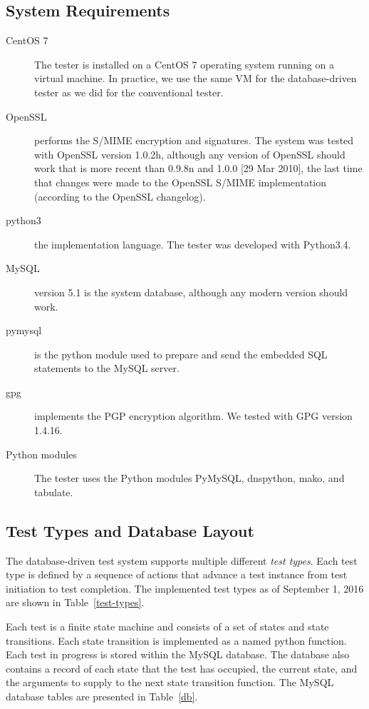 \documentclass[preprint,3p,11pt]{elsarticle}
\begin{document}
\subsection{System Requirements}

\begin{description}
\item[CentOS 7] The tester is installed on a CentOS 7 operating
  system running on a virtual machine. In practice, we use the same VM
  for the database-driven tester as we did for the conventional tester.
\item[OpenSSL] performs the S/MIME encryption and
signatures. The system was tested with OpenSSL version 1.0.2h, although any
version of OpenSSL should work that is more recent than 0.9.8n and
1.0.0 [29 Mar 2010], the last time that changes were made to the OpenSSL
S/MIME implementation (according to the OpenSSL changelog). 

\item[python3] the implementation language. The tester was developed
  with Python3.4.

\item[MySQL] version 5.1 is the system database,
although any modern version should work. 

\item[pymysql] is the python module used to prepare and send the embedded SQL
statements to the MySQL server.

\item[gpg] implements the PGP encryption
algorithm. We tested with GPG version 1.4.16.

\item[Python modules] The tester uses the Python modules PyMySQL,
dnspython, mako, and tabulate.
\end{description}

\subsection{Test Types and Database Layout}
The database-driven test system supports multiple different
\emph{test types}. Each test type is defined by a sequence of actions
that advance a test instance from test initiation to test
completion. The implemented test types as of September 1, 2016 are shown in
Table~\ref{test-types}. 

Each test is a finite state machine and consists of a
set of states and state transitions. Each state transition is
implemented as a named python function. Each test in progress is
stored within the MySQL database. The database also contains a record
of each state that the test has occupied, the current state, and the
arguments to supply to the next state transition function. The MySQL
database tables are presented in Table~\ref{db}. 
\end{document}
